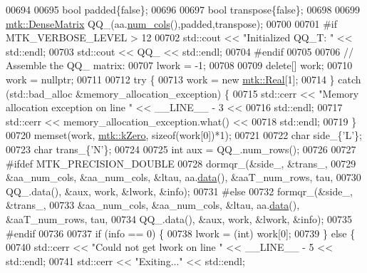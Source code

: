 \begin{DoxyCode}
00694 
00695   \textcolor{keywordtype}{bool} padded\{\textcolor{keyword}{false}\};
00696 
00697   \textcolor{keywordtype}{bool} transpose\{\textcolor{keyword}{false}\};
00698 
00699   \hyperlink{classmtk_1_1DenseMatrix}{mtk::DenseMatrix} QQ\_(aa.\hyperlink{classmtk_1_1DenseMatrix_a41747502d468c6728a4be31501b16e0e}{num\_cols}(),padded,transpose);
00700 
00701 \textcolor{preprocessor}{  #if MTK\_VERBOSE\_LEVEL > 12}
00702   std::cout << \textcolor{stringliteral}{"Initialized QQ\_T: "} << std::endl;
00703   std::cout << QQ\_ << std::endl;
00704 \textcolor{preprocessor}{  #endif}
00705 
00706   \textcolor{comment}{// Assemble the QQ\_ matrix:}
00707   lwork = -1;
00708 
00709   \textcolor{keyword}{delete}[] work;
00710   work = \textcolor{keyword}{nullptr};
00711 
00712   \textcolor{keywordflow}{try} \{
00713     work = \textcolor{keyword}{new} \hyperlink{group__c01-roots_gac080bbbf5cbb5502c9f00405f894857d}{mtk::Real}[1];
00714   \} \textcolor{keywordflow}{catch} (std::bad\_alloc &memory\_allocation\_exception) \{
00715     std::cerr << \textcolor{stringliteral}{"Memory allocation exception on line "} << \_\_LINE\_\_ - 3 <<
00716       std::endl;
00717     std::cerr << memory\_allocation\_exception.what() <<
00718       std::endl;
00719   \}
00720   memset(work, \hyperlink{group__c01-roots_ga59a451a5fae30d59649bcda274fea271}{mtk::kZero}, \textcolor{keyword}{sizeof}(work[0])*1);
00721 
00722   \textcolor{keywordtype}{char} side\_\{\textcolor{charliteral}{'L'}\};
00723   \textcolor{keywordtype}{char} trans\_\{\textcolor{charliteral}{'N'}\};
00724 
00725   \textcolor{keywordtype}{int} aux = QQ\_.num\_rows();
00726 
00727 \textcolor{preprocessor}{  #ifdef MTK\_PRECISION\_DOUBLE}
00728   dormqr\_(&side\_, &trans\_,
00729           &aa\_num\_cols, &aa\_num\_cols, &ltau, aa.\hyperlink{classmtk_1_1DenseMatrix_a0c33b8a9e01d157c61ddbdf807c25d84}{data}(), &aaT\_num\_rows, tau,
00730           QQ\_.data(), &aux, work, &lwork, &info);
00731 \textcolor{preprocessor}{  #else}
00732   formqr\_(&side\_, &trans\_,
00733           &aa\_num\_cols, &aa\_num\_cols, &ltau, aa.\hyperlink{classmtk_1_1DenseMatrix_a0c33b8a9e01d157c61ddbdf807c25d84}{data}(), &aaT\_num\_rows, tau,
00734           QQ\_.data(), &aux, work, &lwork, &info);
00735 \textcolor{preprocessor}{  #endif}
00736 
00737   \textcolor{keywordflow}{if} (info == 0) \{
00738     lwork = (int) work[0];
00739   \} \textcolor{keywordflow}{else} \{
00740     std::cerr << \textcolor{stringliteral}{"Could not get lwork on line "} << \_\_LINE\_\_ - 5 << std::endl;
00741     std::cerr << \textcolor{stringliteral}{"Exiting..."} << std::endl;

\end{DoxyCode}
